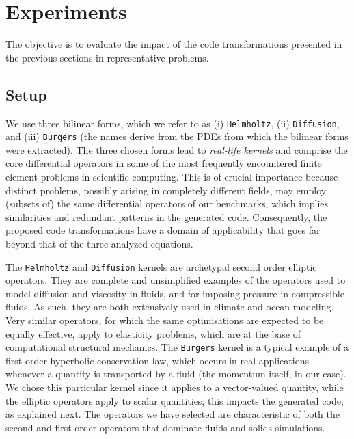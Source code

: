 \section{Experiments}
\label{sec:coffee-perfeval}
The objective is to evaluate the impact of the code transformations presented in the previous sections in representative problems.

\subsection{Setup}
We use three bilinear forms, which we refer to as (i) {\tt Helmholtz}, (ii) {\tt Diffusion}, and (iii) {\tt Burgers} (the names derive from the PDEs from which the bilinear forms were extracted). The three chosen forms lead to \emph{real-life kernels} and comprise the core differential operators in some of the most frequently encountered finite element problems in scientific computing. This is of crucial importance because distinct problems, possibly arising in completely different fields, may employ (subsets of) the same differential operators of our benchmarks, which implies similarities and redundant patterns in the generated code. Consequently, the proposed code transformations have a domain of applicability that goes far beyond that of the three analyzed equations.

The {\tt Helmholtz} and {\tt Diffusion} kernels are archetypal second order elliptic operators. They are complete and unsimplified examples of the operators used to model diffusion and viscosity in fluids, and for imposing pressure in compressible fluids. As such, they are both extensively used in climate and ocean modeling. Very similar operators, for which the same optimisations are expected to be equally effective, apply to elasticity problems, which are at the base of computational structural mechanics. The {\tt Burgers} kernel is a typical example of a first order hyperbolic conservation law, which occurs in real applications whenever a quantity is transported by a fluid (the momentum itself, in our case). We chose this particular kernel since it applies to a vector-valued quantity, while the elliptic operators apply to scalar quantities; this impacts the generated code, as explained next. The operators we have selected are characteristic of both the second and first order operators that dominate fluids and solids simulations.

